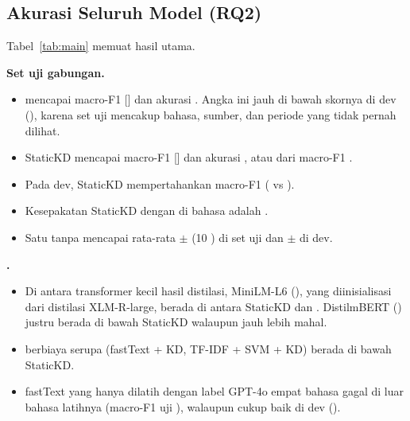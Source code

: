 \subsection{Akurasi Seluruh Model (RQ2)}
\label{sec:res-acc}
\TabMain
Tabel~\ref{tab:main} memuat hasil utama.

\textbf{Set uji gabungan.}
\begin{itemize}
  \item {} mencapai macro-F1  [] dan akurasi . Angka ini jauh di bawah skornya di dev (), karena set uji mencakup bahasa, sumber, dan periode yang tidak pernah dilihat.
  \item StaticKD mencapai macro-F1  [] dan akurasi , atau  dari macro-F1 .
  \item Pada dev, StaticKD mempertahankan  macro-F1  ( vs ).
  \item Kesepakatan StaticKD dengan  di  bahasa  adalah .
  \item Satu  tanpa  mencapai rata-rata  $\pm$  (10 ) di set uji dan  $\pm$  di dev.
\end{itemize}

\textbf{.}
\begin{itemize}
  \item Di antara transformer kecil hasil distilasi, MiniLM-L6 (), yang diinisialisasi dari distilasi XLM-R-large, berada di antara StaticKD dan . DistilmBERT () justru berada di bawah StaticKD walaupun jauh lebih mahal.
  \item {} berbiaya serupa (fastText + KD, TF-IDF + SVM + KD) berada di bawah StaticKD.
  \item fastText yang hanya dilatih dengan label GPT-4o empat bahasa gagal di luar bahasa latihnya (macro-F1 uji ), walaupun cukup baik di dev ().
\end{itemize}

